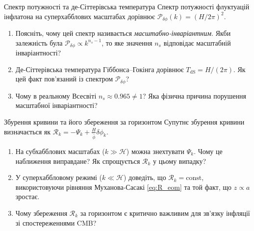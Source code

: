 
\begin{problem}{Спектр потужності та де-Сіттерівська температура}
Спектр потужності флуктуацій інфлатона на суперхабблових масштабах дорівнює
$\mathcal{P}_{\delta\phi}(k) = (H/2\pi)^2$.

\begin{enumerate}
    \item Поясніть, чому цей спектр називається \emph{масштабно-інваріантним}.
          Якби залежність була $\mathcal{P}_{\delta\phi} \propto k^{n_s-1}$, то яке
          значення $n_s$ відповідає масштабній інваріантності?
    \item Де-Сіттерівська температура Гіббонса--Гокінга дорівнює $T_{\mathrm{dS}} = H/(2\pi)$.
          Як цей факт пов'язаний із спектром $\mathcal{P}_{\delta\phi}$?
    \item Чому в реальному Всесвіті $n_s \approx 0.965 \neq 1$? Яка фізична причина
          порушення масштабної інваріантності?
\end{enumerate}
\end{problem}


\begin{problem}{Збурення кривини та його збереження за горизонтом}
Супутнє збурення кривини визначається як $\mathcal{R}_k = -\Psi_k + \frac{H}{\dot{\bar\phi}}\delta\phi_k$.

\begin{enumerate}
    \item На субхабблових масштабах ($k \gg \mathcal{H}$) можна знехтувати $\Psi_k$.
          Чому це наближення виправдане? Як спрощується $\mathcal{R}_k$ у цьому випадку?
    \item У суперхаббловому режимі ($k \ll \mathcal{H}$) доведіть, що $\mathcal{R}_k = \mathrm{const}$,
          використовуючи рівняння Муханова-Сасакі \eqref{eq:R_eom} та той факт, що $z \propto a$ зростає.
    \item Чому збереження $\mathcal{R}_k$ за горизонтом є критично важливим для
          зв'язку інфляції зі спостереженнями CMB?
\end{enumerate}
\end{problem}


